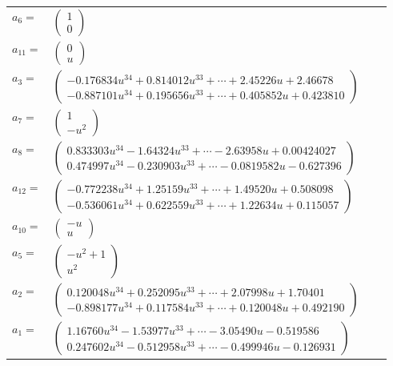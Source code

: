 \documentclass[1p]{elsarticle_modified}
\theoremstyle{definition}
\begin{document}
\begin{tabular}{m{7pt} m{180pt} m{7pt} m{180pt} }
\flushright $a_{6}=$&$\begin{pmatrix}1\\0\end{pmatrix}$ \\
\flushright $a_{11}=$&$\begin{pmatrix}0\\u\end{pmatrix}$ \\
\flushright $a_{3}=$&$\begin{pmatrix}-0.176834 u^{34}+0.814012 u^{33}+\cdots+2.45226 u+2.46678\\-0.887101 u^{34}+0.195656 u^{33}+\cdots+0.405852 u+0.423810\end{pmatrix}$ \\
\flushright $a_{7}=$&$\begin{pmatrix}1\\- u^2\end{pmatrix}$ \\
\flushright $a_{8}=$&$\begin{pmatrix}0.833303 u^{34}-1.64324 u^{33}+\cdots-2.63958 u+0.00424027\\0.474997 u^{34}-0.230903 u^{33}+\cdots-0.0819582 u-0.627396\end{pmatrix}$ \\
\flushright $a_{12}=$&$\begin{pmatrix}-0.772238 u^{34}+1.25159 u^{33}+\cdots+1.49520 u+0.508098\\-0.536061 u^{34}+0.622559 u^{33}+\cdots+1.22634 u+0.115057\end{pmatrix}$ \\
\flushright $a_{10}=$&$\begin{pmatrix}- u\\u\end{pmatrix}$ \\
\flushright $a_{5}=$&$\begin{pmatrix}- u^2+1\\u^2\end{pmatrix}$ \\
\flushright $a_{2}=$&$\begin{pmatrix}0.120048 u^{34}+0.252095 u^{33}+\cdots+2.07998 u+1.70401\\-0.898177 u^{34}+0.117584 u^{33}+\cdots+0.120048 u+0.492190\end{pmatrix}$ \\
\flushright $a_{1}=$&$\begin{pmatrix}1.16760 u^{34}-1.53977 u^{33}+\cdots-3.05490 u-0.519586\\0.247602 u^{34}-0.512958 u^{33}+\cdots-0.499946 u-0.126931\end{pmatrix}$ \\

\end{tabular}
\end{document}
